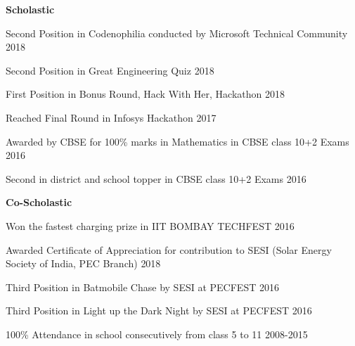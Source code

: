  
\begin{entryulist}
\Large\textbf{Scholastic}
\vspace{5mm}
\\
\entryu

{Second Position {\normalfont in Codenophilia conducted by Microsoft Technical Community }}
{2018}

\entryu

{Second Position {\normalfont in Great Engineering Quiz}}
{2018}

\entryu

{First Position {\normalfont in Bonus Round, Hack With Her, Hackathon}}
{2018}


\entryu

{Reached Final Round {\normalfont in Infosys Hackathon}}
{2017}



\entryu

{Awarded by CBSE for 100\% marks in Mathematics {\normalfont in CBSE class 10+2 Exams}}
{2016}


\entryu

{Second in district and school topper {\normalfont in CBSE class 10+2 Exams}}
{2016}


\Large\textbf{Co-Scholastic}
\vspace{5mm}
\\

\entryu

{Won the fastest charging prize {\normalfont in IIT BOMBAY TECHFEST }}
{2016}

\entryu

{Awarded Certificate of Appreciation {\normalfont for contribution to SESI (Solar Energy Society of India, PEC Branch)}}
{2018}

\entryu

{Third Position {\normalfont in Batmobile Chase by SESI at PECFEST}}
{2016}


\entryu

{Third Position {\normalfont in Light up the Dark Night by SESI at PECFEST}}
{2016}


\entryu

{100\% Attendance {\normalfont in school consecutively from class 5 to 11}}
{2008-2015}


\end{entryulist}